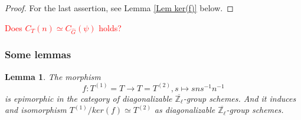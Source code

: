 \documentclass{article}
\newcommand{\red}[1]{\textcolor{red}{#1}}
\newtheorem{lemma}{Lemma}
\begin{document}
\begin{proof}

    For the last assertion, see Lemma \ref{Lem ker(f)} below.
	
\end{proof}

\red{Does $C_T(n) \simeq C_{\hat{G}}(\psi)$ holds?}

\subsubsection{Some lemmas}

\begin{lemma}\label{Lem epic}
	The morphism 
	$$f: T^{(1)} = T \to T = T^{(2)}, s \mapsto sns^{-1}n^{-1}$$
	is epimorphic in the category of diagonalizable $\overline{\mathbb{Z}_{\ell}}$-group schemes. And it induces and isomorphism $T^{(1)}/ker(f) \simeq T^{(2)}$ as diagonalizable $\overline{\mathbb{Z}_{\ell}}$-group schemes.
\end{lemma}
\end{document}
